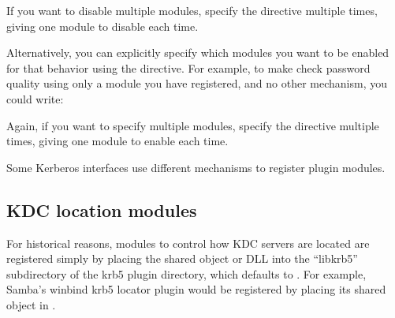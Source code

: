 \documentclass[letterpaper,10pt,english]{sphinxmanual}
\begin{document}
\begin{sphinxVerbatim}[commandchars=\\\{\}]
\PYG{p}{[}\PYG{p}{]}
      
          
\end{sphinxVerbatim}

\sphinxAtStartPar
If you want to disable multiple modules, specify the 
directive multiple times, giving one module to disable each time.

\sphinxAtStartPar
Alternatively, you can explicitly specify which modules you want to be
enabled for that behavior using the  directive.  For
example, to make {\hyperref[\detokenize{admin/admin_commands/kadmind:kadmind-8}]{}} check password quality using only a
module you have registered, and no other mechanism, you could write:

\begin{sphinxVerbatim}[commandchars=\\\{\}]
\PYG{p}{[}\PYG{p}{]}
      
          
          
\end{sphinxVerbatim}

\sphinxAtStartPar
Again, if you want to specify multiple modules, specify the
 directive multiple times, giving one module to enable
each time.

\sphinxAtStartPar
Some Kerberos interfaces use different mechanisms to register plugin
modules.


\subsection{KDC location modules}
\label{\detokenize{admin/host_config:kdc-location-modules}}
\sphinxAtStartPar
For historical reasons, modules to control how KDC servers are located
are registered simply by placing the shared object or DLL into the
“libkrb5” subdirectory of the krb5 plugin directory, which defaults to
{\hyperref[\detokenize{mitK5defaults:paths}]{}}.  For example, Samba’s winbind krb5
locator plugin would be registered by placing its shared object in
{\hyperref[\detokenize{mitK5defaults:paths}]{}}.
\end{document}
